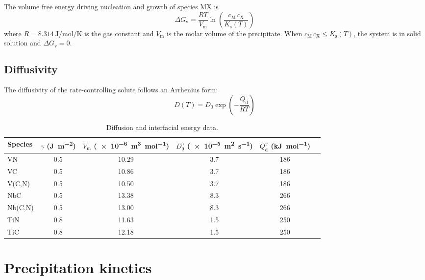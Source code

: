 \documentclass[11pt,a4paper]{article}
\begin{document}
The volume free energy driving nucleation and growth of species MX is
\begin{equation}
  \Delta G_\mathrm{v} = \frac{RT}{V_\mathrm{m}}
    \ln\!\left(\frac{c_\mathrm{M}\,c_\mathrm{X}}{K_\mathrm{s}(T)}\right)
  \label{eq:driving}
\end{equation}
where $R = \SI{8.314}{\joule\per\mole\per\kelvin}$ is the gas constant and
$V_\mathrm{m}$ is the molar volume of the precipitate.  When
$c_\mathrm{M}\,c_\mathrm{X} \le K_\mathrm{s}(T)$, the system is in solid
solution and $\Delta G_\mathrm{v} = 0$.

\subsection{Diffusivity}

The diffusivity of the rate-controlling solute follows an Arrhenius form:
\begin{equation}
  D(T) = D_0 \exp\!\left(-\frac{Q_\mathrm{d}}{RT}\right)
  \label{eq:diffusivity}
\end{equation}

\begin{table}[htbp]
\centering
\caption{Diffusion and interfacial energy data.}
\label{tab:diffusion}
\begin{tabular}{@{}lSSSSS@{}}
\toprule
Species & {$\gamma$ (\si{\joule\per\metre\squared})}
  & {$V_\mathrm{m}$ (\SI{e-6}{\metre\cubed\per\mole})}
  & {$D_0^{\gamma}$ (\SI{e-5}{\metre\squared\per\second})}
  & {$Q_\mathrm{d}^{\gamma}$ (\si{\kilo\joule\per\mole})} \\
\midrule
VN      & 0.5  & 10.29 & 3.7  & 186 \\
VC      & 0.5  & 10.86 & 3.7  & 186 \\
V(C,N)  & 0.5  & 10.50 & 3.7  & 186 \\
NbC     & 0.5  & 13.38 & 8.3  & 266 \\
Nb(C,N) & 0.5  & 13.00 & 8.3  & 266 \\
TiN     & 0.8  & 11.63 & 1.5  & 250 \\
TiC     & 0.8  & 12.18 & 1.5  & 250 \\
\bottomrule
\end{tabular}
\end{table}

\section{Precipitation kinetics}
\label{sec:precip}
\end{document}
